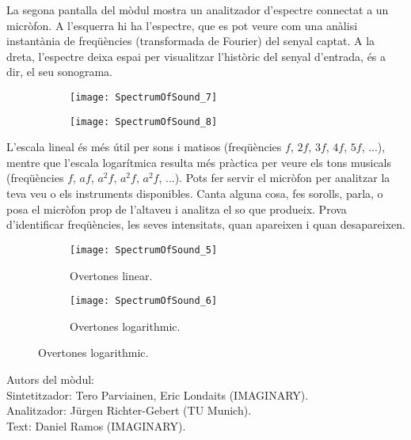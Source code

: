 La segona pantalla del mòdul mostra un analitzador d'espectre connectat a un micròfon. A l'esquerra hi ha l'espectre, que es pot veure com una anàlisi instantània de freqüències (transformada de Fourier) del senyal captat. A la dreta, l'espectre deixa espai per visualitzar l'històric del senyal d'entrada, és a dir, el seu sonograma.

\begin{figure}[h]
\centering
\begin{subfigure}{0.45\textwidth}
\centering
\texttt{[image: SpectrumOfSound\_7]}
\end{subfigure}
\begin{subfigure}{0.45\textwidth}
\centering
\texttt{[image: SpectrumOfSound\_8]}
\end{subfigure}
\end{figure}

L'escala lineal és més útil per sons i matisos (freqüències $f$, $2f$, $3f$, $4f$, $5f$, ...), mentre que l'escala logarítmica resulta més pràctica per veure els tons musicals (freqüències $f$, $af$, $a^2 f$, $a^2 f$, $a^2 f$, ...). Pots fer servir el micròfon per analitzar la teva veu o els instruments disponibles. Canta alguna cosa, fes sorolls, parla, o posa el micròfon prop de l'altaveu i analitza el so que produeix. Prova d'identificar freqüències, les seves intensitats, quan apareixen i quan desapareixen.

\begin{figure}[h]
\centering
\begin{subfigure}{0.45\textwidth}
\centering
\texttt{[image: SpectrumOfSound\_5]}
\caption*{Overtones linear.}
\end{subfigure}
\begin{subfigure}{0.45\textwidth}
\centering
\texttt{[image: SpectrumOfSound\_6]}
\caption*{Overtones logarithmic.}
\end{subfigure}
\end{figure}


\vfill

Autors del mòdul: \\
Sintetitzador: Tero Parviainen, Eric Londaits (IMAGINARY). \\
Analitzador: Jürgen Richter-Gebert (TU Munich). \\
Text: Daniel Ramos (IMAGINARY).

